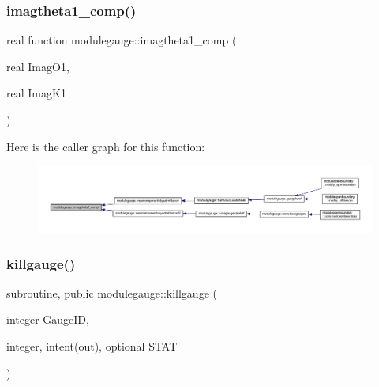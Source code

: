 \subsubsection{\texorpdfstring{imagtheta1\+\_\+comp()}{imagtheta1\_comp()}}
{\footnotesize\ttfamily real function modulegauge\+::imagtheta1\+\_\+comp (\begin{DoxyParamCaption}\item[{real}]{Imag\+O1,  }\item[{real}]{Imag\+K1 }\end{DoxyParamCaption})\hspace{0.3cm}{\ttfamily [private]}}

Here is the caller graph for this function\+:\nopagebreak
\begin{figure}[H]
\begin{center}
\leavevmode
\includegraphics[width=350pt]{namespacemodulegauge_a2e204b866f8da90453f9d7af3fd23ec6_icgraph}
\end{center}
\end{figure}
\mbox{\label{namespacemodulegauge_a545694594f895a232c1f0b4fc8256bb9}} 
\subsubsection{\texorpdfstring{killgauge()}{killgauge()}}
{\footnotesize\ttfamily subroutine, public modulegauge\+::killgauge (\begin{DoxyParamCaption}\item[{integer}]{Gauge\+ID,  }\item[{integer, intent(out), optional}]{S\+T\+AT }\end{DoxyParamCaption})}

